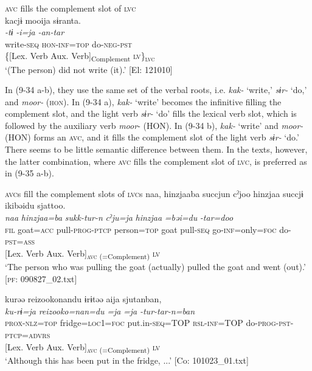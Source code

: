 \ex \textsc{avc} fills the complement slot of \textsc{lvc}\label{ex:9.34b}\\
 \gllll  kacjɨ  mooija  sɨranta.\\
    \textit{-tɨ}  \textit{-i=ja}  \textit{-an-tar}\\
    write-\textsc{seq}  \textsc{hon}-\textsc{inf}=\textsc{top}  do-\textsc{neg}-\textsc{pst}\\
    {\{[Lex. Verb}  {Aux. Verb]\textsubscript{Complement}}  {\textsc{lv}\}\textsubscript{\textsc{lvc}}}\\
    \glt     ‘(The person) did not write (it).’ [El: 121010]
    \z
\z

In (9-34 a-b), they use the same set of the verbal roots, i.e. \textit{kak-} ‘write,’ \textit{sɨr-} ‘do,’ and \textit{moor-} (\textsc{hon}). In (9-34 a), \textit{kak-} ‘write’ becomes the infinitive filling the complement slot, and the light verb \textit{sɨr-} ‘do’ fills the lexical verb slot, which is followed by the auxiliary verb \textit{moor}{}- (HON). In (9-34 b), \textit{kak-} ‘write’ and \textit{moor-} (HON) forms an \textsc{avc}, and it fills the complement slot of the light verb \textit{sɨr-} ‘do.’ There seems to be little semantic difference between them. In the texts, however, the latter combination, where \textsc{avc} fills the complement slot of \textsc{lvc}, is preferred as in (9-35 a-b).

\ea   \textsc{avc}s fill the complement slots of \textsc{lvc}s \label{ex:9.35}
\ea \label{ex:9.35a}%
 \gllll  naa,  hinzjaaba  succjun  cˀjoo  hinzjaa   succjɨ  ikibəidu  sjattoo.\\
      \textit{naa}  \textit{hinzjaa=ba}  \textit{sukk-tur-n}  \textit{cˀju=ja}  \textit{hinzjaa}  \textit{}  \textit{=bəi=du}  \textit{-tar=doo}\\
      \textsc{fil}  goat=\textsc{acc}  pull-\textsc{prog}-\textsc{ptcp}  person=\textsc{top}  goat pull-\textsc{seq}  go-\textsc{inf}=only=\textsc{foc}  do-\textsc{pst}=\textsc{ass}\\
      {}  {}  {}  {} {} {[Lex. Verb}  {Aux. Verb]\textsubscript{\textsc{avc} (=Complement)}}  \textsc{lv}\\
      \glt   ‘The person who was pulling the goat (actually) pulled the goat and went (out).’ [\textsc{pf}: 090827\_02.txt]

\ex \label{ex:9.35b}%
\gllll kurəə  {\textbar}reizooko{\textbar}nandu  ɨrɨtəə  aija   sjutanban,\\
      \textit{ku-rɨ=ja}  \textit{reizooko=nan=du}  \textit{=ja}  \textit{=ja} \textit{-tur-tar-n=ban}\\
      \textsc{prox}-\textsc{nlz}=\textsc{top}  fridge=\textsc{loc}1=\textsc{foc}  put.in{}-\textsc{seq}=TOP  \textsc{rsl}-\textsc{inf}=TOP  do-\textsc{prog}-\textsc{pst}-\textsc{ptcp}=\textsc{advrs}\\
      {}  {}  {[Lex. Verb}  {Aux. Verb]\textsubscript{\textsc{avc} (=Complement)}}  \textsc{lv}      \\
      \glt       ‘Although this has been put in the fridge, ...’ [Co: 101023\_01.txt]
    \z
\z

